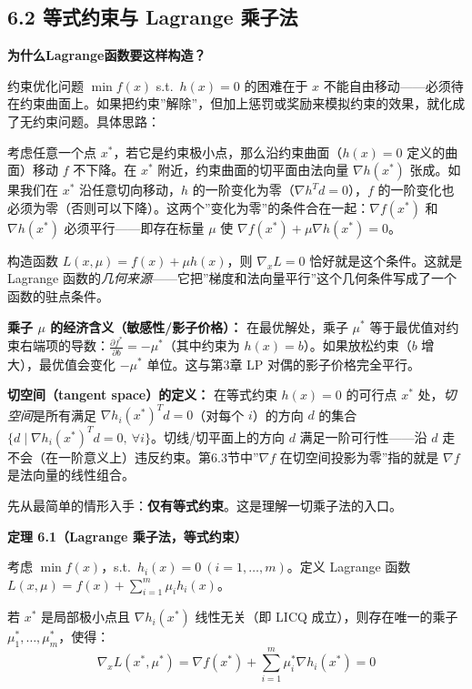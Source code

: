 \subsection{6.2 等式约束与 Lagrange 乘子法}

\textbf{为什么Lagrange函数要这样构造？}

约束优化问题 $\min f(x)$ s.t.\ $h(x)=0$ 的困难在于 $x$ 不能自由移动——必须待在约束曲面上。如果把约束”解除”，但加上惩罚或奖励来模拟约束的效果，就化成了无约束问题。具体思路：

考虑任意一个点 $x^*$，若它是约束极小点，那么沿约束曲面（$h(x)=0$ 定义的曲面）移动 $f$ 不下降。在 $x^*$ 附近，约束曲面的切平面由法向量 $\nabla h(x^*)$ 张成。如果我们在 $x^*$ 沿任意切向移动，$h$ 的一阶变化为零（$\nabla h^T d=0$），$f$ 的一阶变化也必须为零（否则可以下降）。这两个”变化为零”的条件合在一起：$\nabla f(x^*)$ 和 $\nabla h(x^*)$ 必须平行——即存在标量 $\mu$ 使 $\nabla f(x^*) + \mu\nabla h(x^*) = 0$。

构造函数 $L(x,\mu)=f(x)+\mu h(x)$，则 $\nabla_x L=0$ 恰好就是这个条件。这就是 Lagrange 函数的\emph{几何来源}——它把”梯度和法向量平行”这个几何条件写成了一个函数的驻点条件。

\textbf{乘子 $\mu$ 的经济含义（敏感性/影子价格）：} 在最优解处，乘子 $\mu^*$ 等于最优值对约束右端项的导数：$\frac{\partial f^*}{\partial b} = -\mu^*$（其中约束为 $h(x)=b$）。如果放松约束（$b$ 增大），最优值会变化 $-\mu^*$ 单位。这与第3章 LP 对偶的影子价格完全平行。\medskip

\textbf{切空间（tangent space）的定义：} 在等式约束 $h(x)=0$ 的可行点 $x^*$ 处，\emph{切空间}是所有满足 $\nabla h_i(x^*)^T d = 0$（对每个 $i$）的方向 $d$ 的集合 $\{d \mid \nabla h_i(x^*)^T d = 0,\ \forall i\}$。切线/切平面上的方向 $d$ 满足一阶可行性——沿 $d$ 走不会（在一阶意义上）违反约束。第6.3节中”$\nabla f$ 在切空间投影为零”指的就是 $\nabla f$ 是法向量的线性组合。

先从最简单的情形入手：\textbf{仅有等式约束}。这是理解一切乘子法的入口。

\begin{defbox}
\textbf{定理 6.1（Lagrange 乘子法，等式约束）}

考虑 $\min f(x)$，s.t.\ $h_i(x)=0\ (i=1,\dots,m)$。定义 Lagrange 函数
$L(x,\mu)=f(x)+\sum_{i=1}^m \mu_i h_i(x)$。

若 $x^*$ 是局部极小点且 $\nabla h_i(x^*)$ 线性无关（即 LICQ 成立），则存在唯一的乘子 $\mu_1^*,\dots,\mu_m^*$，使得：
\[
\nabla_x L(x^*,\mu^*) = \nabla f(x^*) + \sum_{i=1}^m \mu_i^*\nabla h_i(x^*) = 0
\]
\end{defbox}

